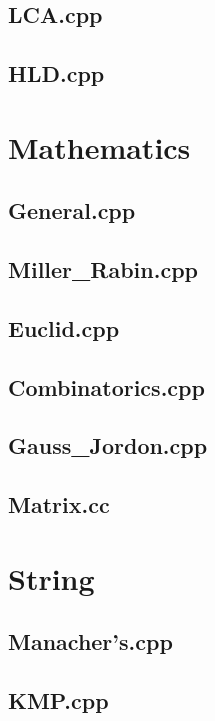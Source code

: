 \subsection{LCA.cpp}

\subsection{HLD.cpp}

\section{Mathematics}
\subsection{General.cpp}

\subsection{Miller\_Rabin.cpp}

\subsection{Euclid.cpp}

\subsection{Combinatorics.cpp}

\subsection{Gauss\_Jordon.cpp}

\subsection{Matrix.cc}

\section{String}
\subsection{Manacher's.cpp}

\subsection{KMP.cpp}

